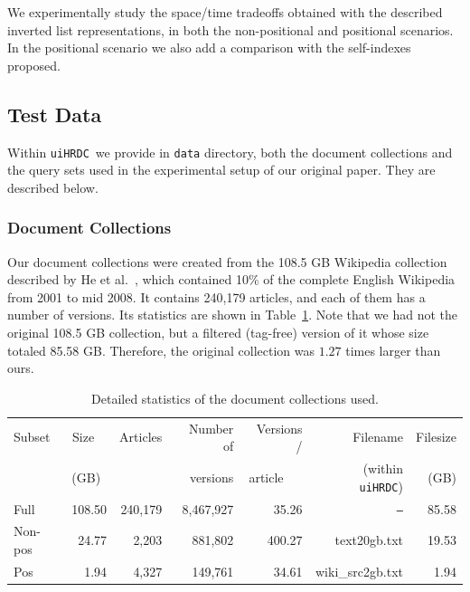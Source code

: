 \documentclass[review]{elsarticle}
\newcommand{\uilib}{{\tt uiHRDC}}
\begin{document}
We experimentally study the space/time tradeoffs obtained with the described 
inverted list representations, in both the non-positional and positional 
scenarios. In the positional scenario we also add a comparison with the 
self-indexes proposed.

\subsection{Test Data} \label{sec:testdata}
Within \uilib\ we provide in \texttt{data} directory, both the document collections and the query sets used in the experimental setup of our original paper.
They are described below.

\subsubsection{Document Collections}

Our document collections were created from the 108.5 GB Wikipedia collection described by He et al.~\cite{HZS10}, which contained 10\% of 
the complete English Wikipedia from 2001 to mid 2008. It contains 240,179 articles, and each of them has a number of versions. Its statistics
are shown in Table~\ref{tab:coll}. Note that we had not the original 108.5 GB collection, but a filtered (tag-free) version of it whose size
totaled 85.58 GB. Therefore, the original collection was $1.27$ times larger than ours.

\begin{table}[htb]
	{\small
		\begin{center}
			\begin{tabular}{|l|r|r|r|r||r|r|}
				\hline                                                                                           
				Subset   & Size~~ & Articles & Number of & Versions / &       {Filename}         &        {Filesize}  \\
				         & (GB)~  &          & versions  & article~~~ &     (within \uilib)      &        {(GB)}      \\
				\hline                                                                                           
				\hline                                                                                           
				Full     & 108.50 &  240,179 & 8,467,927 &      35.26 &        {\tt --}          &            {85.58} \\
				Non-pos  &  24.77 &    2,203 &   881,802 &     400.27 &        {text20gb.txt}    &            {19.53} \\
				Pos      &   1.94 &    4,327 &   149,761 &      34.61 &       { wiki\_src2gb.txt}&             {1.94} \\
				\hline                                                                                           
				
			\end{tabular}
		\end{center}
	}
	\caption{Detailed statistics of the document collections used.} 
	\label{tab:coll}
\end{table}
\end{document}
